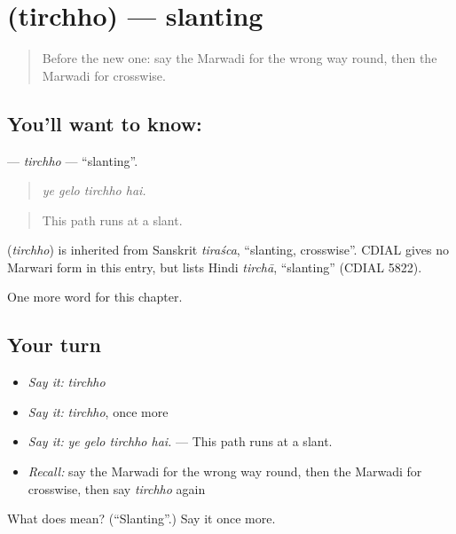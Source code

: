 \section[\texorpdfstring{\mw{तिरछो} (tirchho)}{तिरछो (tirchho)}]{ (tirchho) — slanting}

\label{lesson:MW-C202-tirchho}



\begin{quote}
Before the new one: say the Marwadi for the wrong way round, then the Marwadi for crosswise.
\end{quote}

\subsection*{You'll want to know: }
\textbf{} — \emph{tirchho} — \textquotedblleft{}slanting\textquotedblright{}.

\begin{quote}
   
\end{quote}

\begin{quote}
\emph{ye gelo tirchho hai.}
\end{quote}

\begin{quote}
This path runs at a slant.
\end{quote}

\begin{cousinweb}
\textbf{} (\emph{tirchho}) is inherited from Sanskrit \emph{tiraśca}, \textquotedblleft{}slanting, crosswise\textquotedblright{}. CDIAL gives no Marwari form in this entry, but lists Hindi \emph{tirchā}, \textquotedblleft{}slanting\textquotedblright{} (CDIAL 5822).
\end{cousinweb}

\begin{grammarlens}[title={What you've built}]
One more word for this chapter.
\end{grammarlens}

\subsection*{Your turn}
\begin{itemize}
\raggedright
  \item \emph{Say it:} \emph{tirchho}
  \item \emph{Say it:} \emph{tirchho}, once more
  \item \emph{Say it:} \emph{ye gelo tirchho hai.} — This path runs at a slant.
  \item \emph{Recall:} say the Marwadi for the wrong way round, then the Marwadi for crosswise, then say \emph{tirchho} again
\end{itemize}

\begin{tcolorbox}[breakable,colback=teal!4,colframe=teal!35!black,title={Before you move on}]
What does  mean? (\textquotedblleft{}Slanting\textquotedblright{}.) Say it once more.
\end{tcolorbox}
